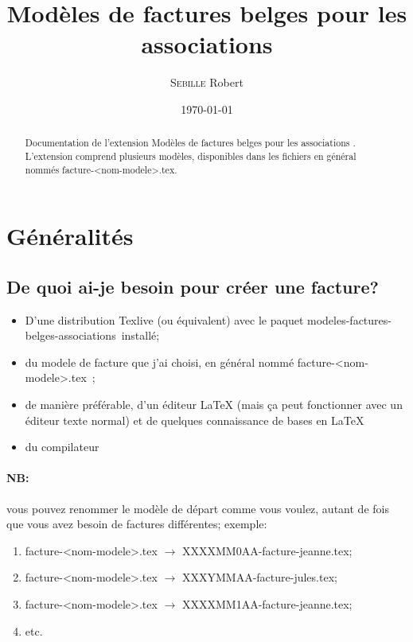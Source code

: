 \documentclass[a4paper,10pt]{article}
\author{\textsc{Sebille} Robert}
\date{\today}
\title{Modèles de factures belges pour les associations}
\begin{document}
\maketitle

\begin{abstract}
Documentation de l'extension \og Modèles de factures belges pour les associations \fg. L'extension comprend plusieurs modèles, disponibles dans les fichiers en général nommés facture-<nom-modele>.tex.
\end{abstract}


\tableofcontents
\newpage

\section{Généralités}

\subsection{De quoi ai-je besoin pour créer une facture?}
\begin{itemize}
	\item D'une distribution Texlive (ou équivalent) avec le paquet \og modeles-factures-belges-associations\ \fg installé;
	\item du modele de facture que j'ai choisi, en général nommé \og facture-<nom-modele>.tex\ \fg;
	\item de manière préférable, d'un éditeur \LaTeX{} (mais ça peut fonctionner avec un éditeur texte normal) et de quelques connaissance de bases en \LaTeX{}
	\item du compilateur \XeLaTeX{} 
\end{itemize}

\paragraph*{NB:} vous pouvez renommer le modèle de départ comme vous voulez, autant de fois que vous avez besoin de factures différentes; exemple:
\begin{enumerate}
	\item facture-<nom-modele>.tex $ \rightarrow $ XXXXMM0AA-facture-jeanne.tex;
	\item facture-<nom-modele>.tex $ \rightarrow $ XXXYMMAA-facture-jules.tex;
	\item facture-<nom-modele>.tex $ \rightarrow $ XXXXMM1AA-facture-jeanne.tex;
	\item etc.
\end{enumerate} 
\end{document}

